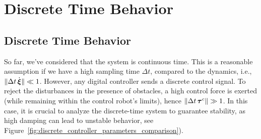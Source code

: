 \ifthesis
\section{Discrete Time Behavior} \label{sec:discrete_time_behavior}
\else
\subsection{Discrete Time Behavior} \label{sec:discrete_time_behavior}
\fi

So far, we've considered that the system is continuous time. 
This is a reasonable assumption if we have a high sampling time $\Delta t$, compared to the dynamics, i.e., $\| \Delta t \, \dot{\boldsymbol{\xi}} \| \ll 1$.
However, any digital controller sends a discrete control signal. To reject the disturbances in the presence of obstacles, a high control force is exerted (while remaining within the control robot's limits), hence $\| \Delta t \, \boldsymbol{\tau}^c \| \gg 1$. 
In this case, it is crucial to analyze the discrete-time system to guarantee stability, as high damping can lead to unstable behavior, see Figure~\ref{fig:discrete_controller_parameters_comparison}).

